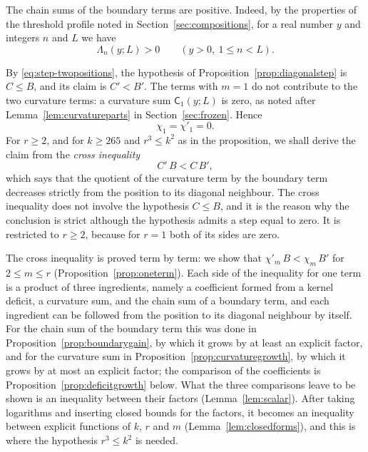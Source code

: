 \documentclass{amsart}
\theoremstyle{definition}
\theoremstyle{remark}
\numberwithin{equation}{section}
\begin{document}
The chain sums of the boundary terms are positive. Indeed, by the properties
of the threshold profile noted in Section~\ref{sec:compositions}, for a real
number $y$ and integers $n$ and $L$ we have
\begin{equation}\label{eq:step-chainpositive}
\Lambda_n(y;L)>0\qquad(y>0,\ 1\le n<L).
\end{equation}

By \eqref{eq:step-twopositions}, the hypothesis of
Proposition~\ref{prop:diagonalstep} is $C\le B$, and its claim is
$C'<B'$. The terms with $m=1$ do not contribute to
the two curvature terms: a curvature sum $\mathsf C_1(y;L)$ is zero, as
noted after Lemma~\ref{lem:curvatureparts} in Section~\ref{sec:frozen}. Hence
\begin{equation}\label{eq:step-firstterm}
\chi_1=\chi'_1=0 .
\end{equation}
For $r\ge2$, and for $k\ge265$ and $r^3\le k^2$ as in the proposition, we
shall derive the claim from the \emph{cross inequality}
\begin{equation}\label{eq:step-cross}
C'\,B<C\,B' ,
\end{equation}
which says that the quotient of the curvature term by the boundary term
decreases strictly from the position to its diagonal neighbour. The cross
inequality does not involve the hypothesis $C\le B$, and it is the reason
why the conclusion is strict although the hypothesis admits a step equal to
zero. It is restricted to $r\ge2$, because for $r=1$ both of its sides are
zero.

The cross inequality is proved term by term: we show that
$\chi'_m\,B<\chi_m\,B'$ for $2\le m\le r$
(Proposition~\ref{prop:oneterm}). Each side of the inequality
for one term is a product of three ingredients, namely a coefficient formed
from a kernel deficit, a curvature sum, and the chain sum of a boundary
term, and each ingredient can be followed from the position to its diagonal
neighbour by itself. For the chain sum of the boundary term this was done in
Proposition~\ref{prop:boundarygain}, by which it grows by at least an
explicit factor, and for the curvature sum in
Proposition~\ref{prop:curvaturegrowth}, by which it grows by at most an
explicit factor; the comparison of the coefficients is
Proposition~\ref{prop:deficitgrowth} below. What the three
comparisons leave to be shown is an inequality between their factors
(Lemma~\ref{lem:scalar}). After taking logarithms and inserting closed bounds
for the factors, it becomes an inequality between explicit functions of $k$,
$r$ and $m$ (Lemma~\ref{lem:closedforms}), and this is where the hypothesis
$r^3\le k^2$ is needed.
\end{document}
